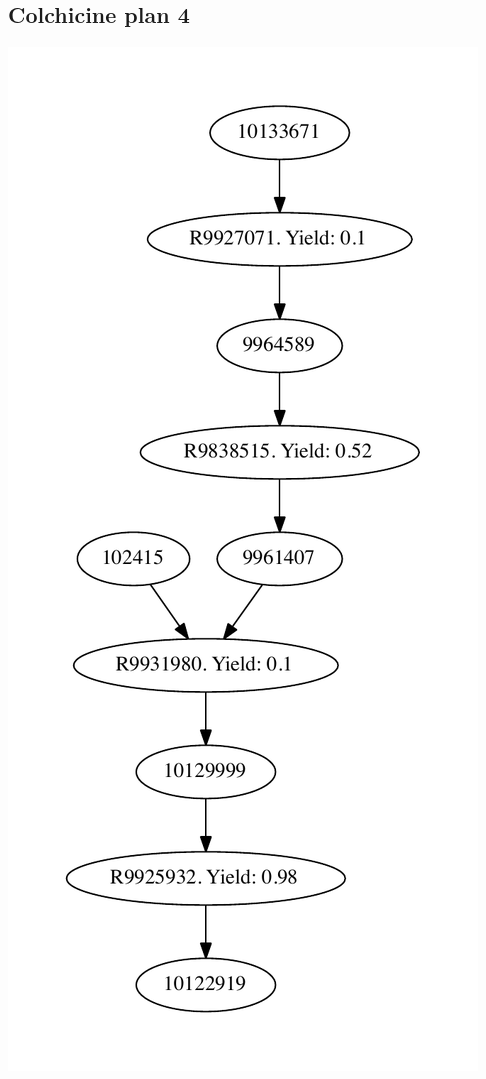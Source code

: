 \documentclass[a4paper,10pt,titlepage]{paper}
\begin{document}
\subsection{Colchicine plan 4}
\centering
\includegraphics[scale=0.4]{Synteseplaner/Colchicine/plan4.pdf}
\label{Appendix::Colchicine4}
\end{document}
